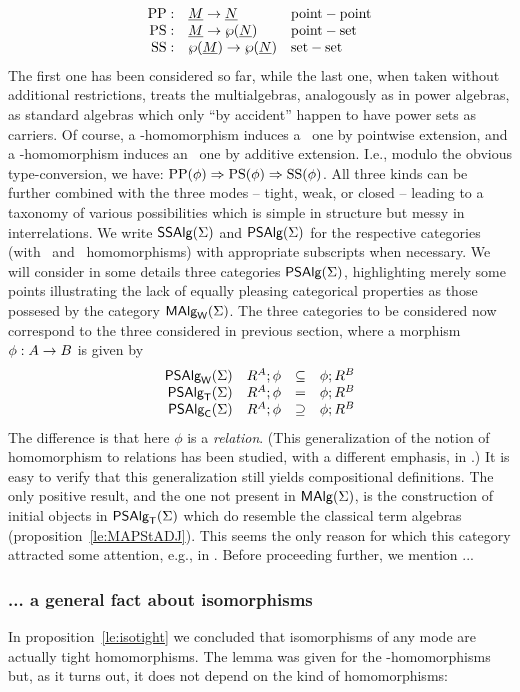\documentclass[10pt]{article}
\begin{document}
\[ \begin{array}{rll}
{\rm PP}: & \underline {M} \rightarrow \underline {N} & {\rm point-point} \\
{\rm PS}: & \underline {M} \rightarrow \wp(\underline {N}) & {\rm point-set} \\
{\rm SS}:& \wp(\underline {M})\rightarrow \wp(\underline {N}) & {\rm set-set}
\end{array}
\]
%
The first one has been considered so far, while the last one, when
taken without additional restrictions, treats the multialgebras,
analogously as in power algebras, as standard algebras which only ``by
accident'' happen to have power sets as carriers.  Of course, a
\PP-homomorphism induces a \PS\ one by pointwise extension, and a
\PS-homomorphism induces an \SSs\ one by additive extension.  I.e.,
modulo the obvious type-conversion, we have: ${\rm PP}(\phi) \Rightarrow
{\rm PS}(\phi) \Rightarrow {\rm SS}(\phi)$. All three kinds can be further
combined with the three modes -- tight, weak, or closed -- leading to
a taxonomy of various possibilities which is simple in structure but
messy in interrelations.  We write $\mbox{\sf SSAlg}(\Sigma)$ and $\mbox{\sf PSAlg}(\Sigma)$ for the
respective categories (with \SSs\ and \PS\ homomorphisms) with
appropriate subscripts when necessary.  We will consider in some
details three categories $\mbox{\sf PSAlg}(\Sigma)$, highlighting merely some points
illustrating the lack of equally pleasing categorical properties as
those possesed by the category $\mbox{\rm\sf MAlg}_{\sf W}(\Sigma)$.  The three categories to be considered now
correspond to the three considered in previous section, where a morphism 
$\phi:A\rightarrow B$ is given by
\[
\begin{array}{rrcl}
\mbox{\sf PSAlg}_{\sf W}(\Sigma) & R^A; \phi & \subseteq & \phi; R^B \\
\mbox{\sf PSAlg}_{\sf T}(\Sigma) & R^A; \phi & = & \phi; R^B \\
\mbox{\sf PSAlg}_{\sf C}(\Sigma) & R^A; \phi & \supseteq & \phi; R^B 
\end{array}
\]
The difference is that here $\phi$ is a {\em relation}. (This generalization of
the notion of homomorphism to relations has been studied,
with a different emphasis, in \cite{koh2}.) It is easy to verify that this generalization
still yields compositional definitions.
The only positive result, and
the one not present in $\mbox{\rm\sf MAlg}(\Sigma)$, is the construction of initial objects
in $\mbox{\sf PSAlg}_{\sf T}(\Sigma)$ which do resemble the classical term algebras
(proposition~\ref{le:MAPStADJ}). This seems the only reason for which this category
attracted some attention, e.g., in \cite{c:57,c:59}.
Before proceeding further, we mention ...
\subsubsection*{... a general fact about isomorphisms}
In proposition~\ref{le:isotight} we concluded that isomorphisms of any mode
are actually tight homomorphisms. The lemma was given for the 
\PP-homomorphisms but, as it turns out, it does not depend on the kind
of homomorphisms:
\end{document}

